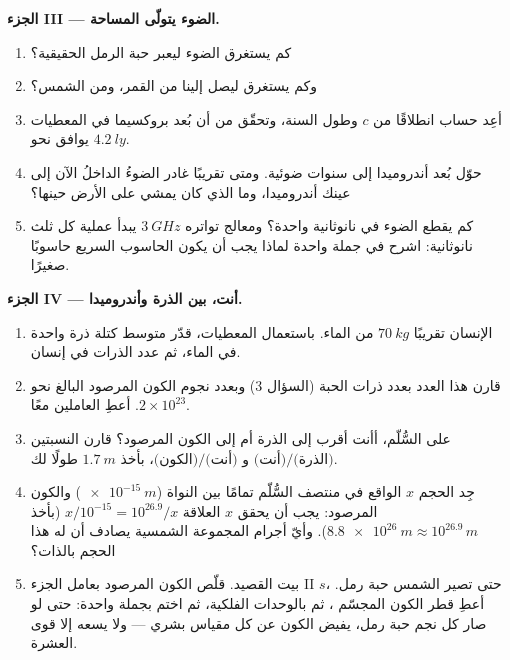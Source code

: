 \begin{problem}
\medskip
\noindent\textbf{الجزء III --- الضوء يتولّى المساحة.}
\begin{enumerate}[resume]
  \item كم يستغرق الضوء ليعبر حبة الرمل الحقيقية؟
  \item وكم يستغرق ليصل إلينا من القمر، ومن
        الشمس؟
  \item أعِد حساب   انطلاقًا من $c$ وطول
        السنة، وتحقّق من أن بُعد بروكسيما في المعطيات
        يوافق نحو $\qty{4.2}{ly}$.
  \item حوّل بُعد أندروميدا إلى سنوات ضوئية. ومتى تقريبًا
        غادر الضوءُ الداخلُ الآن إلى عينك أندروميدا، وما الذي
        كان يمشي على الأرض حينها؟
  \item كم يقطع الضوء في نانوثانية واحدة؟ ومعالج
        تواتره $\qty{3}{GHz}$ يبدأ عملية كل ثلث
        نانوثانية: اشرح في جملة واحدة لماذا يجب أن يكون الحاسوب
        السريع حاسوبًا صغيرًا.
\end{enumerate}

\medskip
\noindent\textbf{الجزء IV --- أنت، بين الذرة وأندروميدا.}
\begin{enumerate}[resume]
  \item الإنسان تقريبًا $\qty{70}{kg}$ من الماء. باستعمال المعطيات،
        قدّر متوسط كتلة ذرة واحدة في الماء، ثم
        عدد الذرات في إنسان.
  \item قارن هذا العدد بعدد ذرات الحبة (السؤال 3)
        وبعدد نجوم الكون المرصود البالغ نحو
        $2\times10^{23}$. أعطِ العاملين معًا.
  \item على السُّلّم، أأنت أقرب إلى الذرة أم إلى الكون
        المرصود؟ قارن النسبتين $\text{(أنت)}/\text{(الذرة)}$ و
        $\text{(الكون)}/\text{(أنت)}$، بأخذ $\qty{1.7}{m}$ طولًا
        لك.
  \item جِد الحجم $x$ الواقع في منتصف السُّلّم تمامًا
        بين النواة ($\qty{e-15}{m}$) والكون
        المرصود: يجب أن يحقق $x$ العلاقة $x / 10^{-15} = 10^{26.9} / x$
        (بأخذ $\qty{8.8e26}{m} \approx 10^{26.9}\,\unit{m}$). وأيّ أجرام
        المجموعة الشمسية يصادف أن له هذا الحجم بالذات؟
  \item بيت القصيد. قلّص الكون المرصود بعامل الجزء II
        $s$، حتى تصير الشمس حبة رمل. أعطِ قطر الكون
        المجسّم ، ثم بالوحدات الفلكية، ثم
        اختم بجملة واحدة: حتى لو صار كل نجم حبة
        رمل، يفيض الكون عن كل مقياس بشري --- ولا يسعه
        إلا قوى العشرة.
\end{enumerate}
\end{problem}
